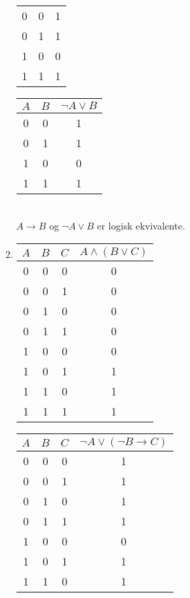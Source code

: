 \documentclass[a4paper, 12pt]{article}  %
\begin{document}
\begin{enumerate}
\begin{enumerate}
\begin{tabular}[t]{cc|c}
            \hline
            0 & 0 & 1 \\
            0 & 1 & 1 \\
            1 & 0 & 0 \\
            1 & 1 & 1 \\
        \end{tabular}
        \hspace*{1em}
        \begin{tabular}[t]{cc|c}
            \(A\) & \(B\) & \(\neg A \lor B\) \\
            \hline
            0 & 0 & 1 \\
            0 & 1 & 1 \\
            1 & 0 & 0 \\
            1 & 1 & 1 \\
        \end{tabular}
        \\[1em]
        \(A \to B\) og \(\neg A \lor B\) er logisk ekvivalente.
        \item
        \begin{tabular}[t]{ccc|c}
            \(A\) & \(B\) & \(C\) & \(A \land (B \lor C) \) \\
            \hline
            0 & 0 & 0 & 0 \\
            0 & 0 & 1 & 0 \\
            0 & 1 & 0 & 0 \\
            0 & 1 & 1 & 0 \\
            1 & 0 & 0 & 0 \\
            1 & 0 & 1 & 1 \\
            1 & 1 & 0 & 1 \\
            1 & 1 & 1 & 1 \\
        \end{tabular}
        \hspace*{1em}
        \begin{tabular}[t]{ccc|c}
            \(A\) & \(B\) & \(C\) & \(\neg A \lor (\neg B \to C) \) \\
            \hline
            0 & 0 & 0 & 1 \\
            0 & 0 & 1 & 1 \\
            0 & 1 & 0 & 1 \\
            0 & 1 & 1 & 1 \\
            1 & 0 & 0 & 0 \\
            1 & 0 & 1 & 1 \\
            1 & 1 & 0 & 1 \\

\end{tabular}
\end{enumerate}
\end{enumerate}
\end{document}
